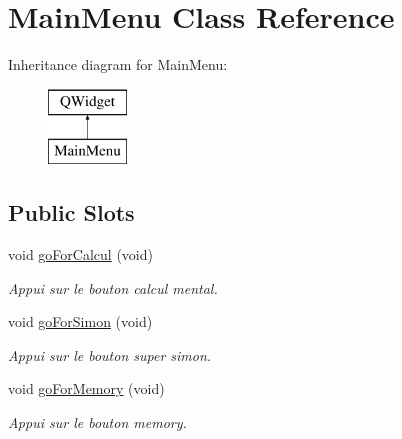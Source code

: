 \hypertarget{class_main_menu}{}\section{Main\+Menu Class Reference}
\label{class_main_menu}
Inheritance diagram for Main\+Menu\+:\begin{figure}[H]
\begin{center}
\leavevmode
\includegraphics[height=2.000000cm]{class_main_menu}
\end{center}
\end{figure}
\subsection*{Public Slots}
\begin{DoxyCompactItemize}
\item 
void \hyperlink{class_main_menu_aecda91a1fbea29f928cf2334d5c5b1f3}{go\+For\+Calcul} (void)
\begin{DoxyCompactList}\small\item\em Appui sur le bouton calcul mental. \end{DoxyCompactList}\item 
\mbox{\label{class_main_menu_a5f48134eefe4cc9e0a00922c4a09a647}} 
void \hyperlink{class_main_menu_a5f48134eefe4cc9e0a00922c4a09a647}{go\+For\+Simon} (void)
\begin{DoxyCompactList}\small\item\em Appui sur le bouton super simon. \end{DoxyCompactList}\item 
\mbox{\label{class_main_menu_acc85e8df6cc1cf76fac3dfa998fbabc0}} 
void \hyperlink{class_main_menu_acc85e8df6cc1cf76fac3dfa998fbabc0}{go\+For\+Memory} (void)
\begin{DoxyCompactList}\small\item\em Appui sur le bouton memory. \end{DoxyCompactList}\end{DoxyCompactItemize}
